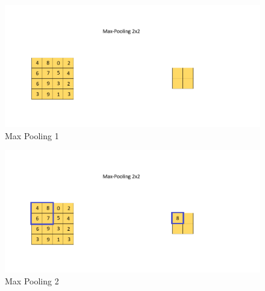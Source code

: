 \documentclass[a4paper,12pt]{report}
\begin{document}
\begin{figure}[htbp]
  \centering
  \includegraphics[width=\textwidth]{images/CNN_Max_Pooling_0.png}
  \caption{Max Pooling 1}
  \label{fig:fullwidth}
\end{figure}
	
\begin{figure}[htbp]
  \centering
  \includegraphics[width=\textwidth]{images/CNN_Max_Pooling_1.png}
  \caption{Max Pooling 2}
  \label{fig:fullwidth}
\end{figure}
\end{document}
